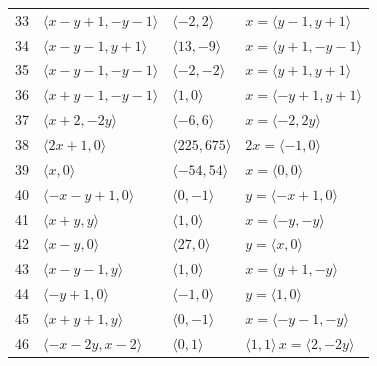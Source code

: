 \documentclass[11pt]{article}
\begin{document}
\begin{longtable}{@{}rlll@{}}
33 & $\langle x-y+1,-y-1\rangle$ & $\langle -2,2\rangle$ & $x=\langle y-1,y+1\rangle$\\
34 & $\langle x-y-1,y+1\rangle$ & $\langle 13,-9\rangle$ & $x=\langle y+1,-y-1\rangle$\\
35 & $\langle x-y-1,-y-1\rangle$ & $\langle -2,-2\rangle$ & $x=\langle y+1,y+1\rangle$\\
36 & $\langle x+y-1,-y-1\rangle$ & $\langle 1,0\rangle$ & $x=\langle -y+1,y+1\rangle$\\
37 & $\langle x+2,-2y\rangle$ & $\langle -6,6\rangle$ & $x=\langle -2,2y\rangle$\\
38 & $\langle 2x+1,0\rangle$ & $\langle 225,675\rangle$ & $2x=\langle -1,0\rangle$\\
39 & $\langle x,0\rangle$ & $\langle -54,54\rangle$ & $x=\langle 0,0\rangle$\\
40 & $\langle -x-y+1,0\rangle$ & $\langle 0,-1\rangle$ & $y=\langle -x+1,0\rangle$\\
41 & $\langle x+y,y\rangle$ & $\langle 1,0\rangle$ & $x=\langle -y,-y\rangle$\\
42 & $\langle x-y,0\rangle$ & $\langle 27,0\rangle$ & $y=\langle x,0\rangle$\\
43 & $\langle x-y-1,y\rangle$ & $\langle 1,0\rangle$ & $x=\langle y+1,-y\rangle$\\
44 & $\langle -y+1,0\rangle$ & $\langle -1,0\rangle$ & $y=\langle 1,0\rangle$\\
45 & $\langle x+y+1,y\rangle$ & $\langle 0,-1\rangle$ & $x=\langle -y-1,-y\rangle$\\
46 & $\langle -x-2y,x-2\rangle$ & $\langle 0,1\rangle$ & $\langle 1,1\rangle\,x=\langle 2,-2y\rangle$\\
\end{longtable}
\endgroup
\end{document}
